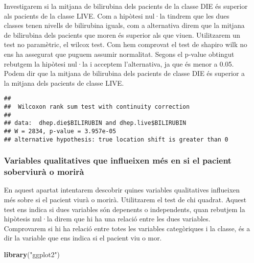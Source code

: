 \documentclass[]{article}
\newenvironment{Shaded}{\begin{snugshade}}{\end{snugshade}}
\newcommand{\DataTypeTok}[1]{\textcolor[rgb]{0.13,0.29,0.53}{#1}}
\newcommand{\KeywordTok}[1]{\textcolor[rgb]{0.13,0.29,0.53}{\textbf{#1}}}
\newcommand{\NormalTok}[1]{#1}
\newcommand{\OperatorTok}[1]{\textcolor[rgb]{0.81,0.36,0.00}{\textbf{#1}}}
\newcommand{\OtherTok}[1]{\textcolor[rgb]{0.56,0.35,0.01}{#1}}
\newcommand{\StringTok}[1]{\textcolor[rgb]{0.31,0.60,0.02}{#1}}
\begin{document}
Investigarem si la mitjana de bilirubina dels pacients de la classe DIE
és superior als pacients de la classe LIVE. Com a hipòtesi nul·la
tindrem que les dues classes tenen nivells de bilirubina iguals, com a
alternativa direm que la mitjana de bilirubina dels pacients que moren
és superior als que viuen. Utilitzarem un test no paramètric, el wilcox
test. Com hem comprovat el test de shapiro wilk no ens ha assegurat que
puguem assumir normalitat. Segons el p-value obtingut rebutgem la
hipòtesi nul·la i acceptem l'alternativa, ja que és menor a 0.05. Podem
dir que la mitjana de bilirubina dels pacients de classe DIE és superior
a la mitjana dels pacients de classe LIVE.

\begin{Shaded}
\end{Shaded}

\begin{verbatim}
## 
##  Wilcoxon rank sum test with continuity correction
## 
## data:  dhep.die$BILIRUBIN and dhep.live$BILIRUBIN
## W = 2834, p-value = 3.957e-05
## alternative hypothesis: true location shift is greater than 0
\end{verbatim}

\hypertarget{variables-qualitatives-que-influeixen-muxe9s-en-si-el-pacient-soberviuruxe0-o-moriruxe0}{%
\subsubsection{Variables qualitatives que influeixen més en si el
pacient soberviurà o
morirà}\label{variables-qualitatives-que-influeixen-muxe9s-en-si-el-pacient-soberviuruxe0-o-moriruxe0}}

En aquest apartat intentarem descobrir quines variables qualitatives
influeixen més sobre si el pacient viurà o morirà. Utilitzarem el test
de chi quadrat. Aquest test ens indica si dues variables són depenents o
independents, quan rebutjem la hipòtesis nul·la direm que hi ha una
relació entre les dues variables. Comprovarem si hi ha relació entre
totes les variables categòriques i la classe, és a dir la variable que
ens indica si el pacient viu o mor.

\begin{Shaded}
\begin{Highlighting}[]
\KeywordTok{library}\NormalTok{(}\StringTok{"ggplot2"}\NormalTok{)}
\end{Highlighting}
\end{Shaded}
\end{document}
